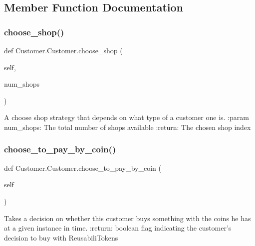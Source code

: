 \subsection{Member Function Documentation}
\mbox{\label{class_customer_1_1_customer_a38dfeb79b9aaa0e75bd78f3a5e23e71e}} 
\subsubsection{\texorpdfstring{choose\+\_\+shop()}{choose\_shop()}}
{\footnotesize\ttfamily def Customer.\+Customer.\+choose\+\_\+shop (\begin{DoxyParamCaption}\item[{}]{self,  }\item[{}]{num\+\_\+shops }\end{DoxyParamCaption})}

\begin{DoxyVerb}A choose shop strategy that depends on what type of a customer one is.
:param num_shops: The total number of shops available
:return: The chosen shop index
\end{DoxyVerb}
 \mbox{\label{class_customer_1_1_customer_a86df6d77038d58a8497b0dbcdb0d3872}} 
\subsubsection{\texorpdfstring{choose\+\_\+to\+\_\+pay\+\_\+by\+\_\+coin()}{choose\_to\_pay\_by\_coin()}}
{\footnotesize\ttfamily def Customer.\+Customer.\+choose\+\_\+to\+\_\+pay\+\_\+by\+\_\+coin (\begin{DoxyParamCaption}\item[{}]{self }\end{DoxyParamCaption})}

\begin{DoxyVerb}Takes a decision on whether this customer buys something with the coins he has
at a given instance in time.
:return: boolean flag indicating the customer's decision to buy with ReusabiliTokens
\end{DoxyVerb}
 \mbox{\label{class_customer_1_1_customer_aecee1601bb165a1a341d65c2041a3cbf}} 
